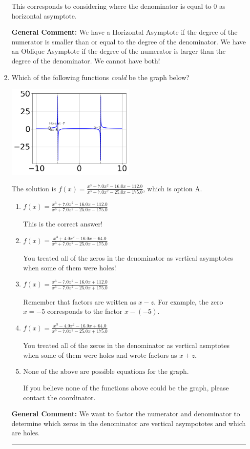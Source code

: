 \documentclass{extbook}[14pt]
\newcommand{\litem}[1]{\item #1

\rule{\textwidth}{0.4pt}}
\begin{document}
\begin{enumerate}
{\begin{enumerate}[label=\Alph*.]
This corresponds to considering where the denominator is equal to 0 as horizontal asymptote.
\end{enumerate}

\textbf{General Comment:} We have a Horizontal Asymptote if the degree of the numerator is smaller than or equal to the degree of the denominator. We have an Oblique Asymptote if the degree of the numerator is larger than the degree of the denominator. We cannot have both!
}
\litem{
Which of the following functions \textit{could} be the graph below?

\begin{center}
    \includegraphics[width=0.5\textwidth]{../Figures/identifyGraphOfRationalFunctionA.png}
\end{center}


The solution is \( f(x)=\frac{x^{3} +7.0 x^{2} -16.0 x -112.0}{x^{3} +7.0 x^{2} -25.0 x -175.0} \), which is option A.\begin{enumerate}[label=\Alph*.]
\item \( f(x)=\frac{x^{3} +7.0 x^{2} -16.0 x -112.0}{x^{3} +7.0 x^{2} -25.0 x -175.0} \)

This is the correct answer!
\item \( f(x)=\frac{x^{3} +4.0 x^{2} -16.0 x -64.0}{x^{3} +7.0 x^{2} -25.0 x -175.0} \)

You treated all of the zeros in the denominator as vertical asymptotes when some of them were holes!
\item \( f(x)=\frac{x^{3} -7.0 x^{2} -16.0 x + 112.0}{x^{3} -7.0 x^{2} -25.0 x + 175.0} \)

Remember that factors are written as $x-z$. For example, the zero $x=-5$ corresponds to the factor $x-(-5)$.
\item \( f(x)=\frac{x^{3} -4.0 x^{2} -16.0 x + 64.0}{x^{3} -7.0 x^{2} -25.0 x + 175.0} \)

You treated all of the zeros in the denominator as vertical asmptotes when some of them were holes and wrote factors as $x+z$.
\item \( \text{None of the above are possible equations for the graph.} \)

If you believe none of the functions above could be the graph, please contact the coordinator.
\end{enumerate}

\textbf{General Comment:} We want to factor the numerator and denominator to determine which zeros in the denominator are vertical asympototes and which are holes.
}
\end{enumerate}
\end{document}
